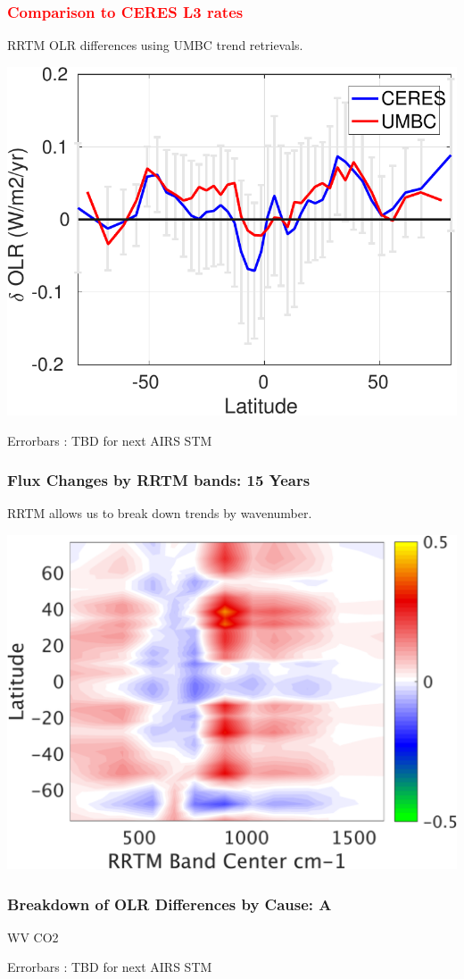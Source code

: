\documentclass[10pt,t]{beamer}
\begin{document}
\begin{frame}
  \frametitle{\textcolor{red}{\bf Comparison to CERES L3 rates}}
  RRTM OLR differences using UMBC trend retrievals.
  \begin{center}
    \noindent\includegraphics[width=0.725\linewidth]{Figs/umbc_vs_ceres_fluxrates.pdf}
  \end{center}
 Errorbars : TBD for next AIRS STM
\end{frame}

\begin{frame}
  \frametitle{Flux Changes by RRTM bands: 15 Years}
  RRTM allows us to break down trends by wavenumber.\newline 
  \begin{center}
    \noindent\includegraphics[width=0.625\linewidth]{Figs/umbc_vs_band_fluxrates.png}
  \end{center}
\end{frame}

\begin{frame}
  \frametitle{Breakdown of OLR Differences by Cause: A}

  \hspace{0.50in} WV  \hspace{1.5in} CO2 \\
  \begin{center}
  \end{center}
 Errorbars : TBD for next AIRS STM
\end{frame}
\end{document}
